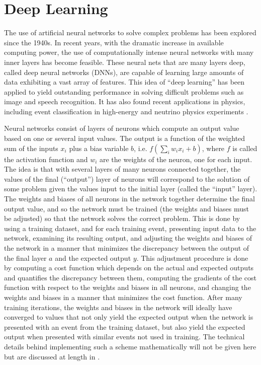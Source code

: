 \documentclass[a4paper,11pt]{article}
\begin{document}
\section{Deep Learning}
The use of artificial neural networks to solve complex problems has been explored since the 1940s.  In recent years, with the dramatic increase in available computing power, the use of computationally
intense neural networks with many inner layers has become feasible.  These neural nets that are many layers deep, called deep neural networks (DNNs), are capable of learning large
amounts of data exhibiting a vast array of features.  This idea of ``deep learning'' has been applied to yield outstanding performance in solving difficult problems such as image \cite{Googlenet} 
and speech \cite{Hinton_2012} recognition.  It has also found recent applications in physics, including event classification in high-energy and neutrino physics experiments \cite{Aurisano_2016, Baldi_2014, deOliveira_2016, Racah_2016}.

Neural networks consist of layers of neurons which compute an output value based on one or several input values.  The output is a function of the weighted sum of the inputs $x_{i}$ plus a bias variable $b$, i.e. $f(\sum_{i}w_{i}x_{i} + b)$, where $f$ is called the activation function and $w_{i}$ are the weights of the neuron, one for each input.  The idea is that
with several layers of many neurons connected together, the values of the final (``output'') layer of neurons will correspond to the solution of some problem given the values input to the
initial layer (called the ``input'' layer).  The weights and biases of all neurons in the network together determine the final output value, and so the network must be trained (the weights and
biases must be adjusted) so that the network solves the correct problem.  This is done by using a training dataset, and for each training event, presenting input data to the network, 
examining its resulting output, and adjusting the weights and biases of the network in a manner that minimizes the discrepancy between the output of the final layer $a$ and the expected 
output $y$.  This adjustment procedure is done by computing a cost function which depends on the actual and expected outputs and quantifies the discrepancy between them, computing 
the gradients of the cost function with respect to the weights and biases in all neurons, and changing the weights and biases in a manner that minimizes the cost function.  After many training
iterations, the weights and biases in the network will ideally have converged to values that not only yield the expected output when the network is presented with an event from the training
dataset, but also yield the expected output when presented with similar events not used in training.  The technical
details behind implementing such a scheme mathematically will not be given here but are discussed at length in \cite{Nielsen_2016}.
\end{document}
